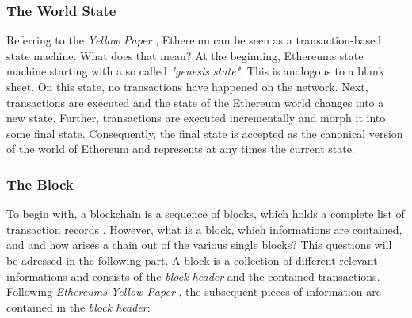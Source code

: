 \subsubsection{The World State}
Referring to the \textit{Yellow Paper} \cite{wood2014ethereum}, Ethereum can be seen as a transaction-based state machine. What does that mean? At the beginning, Ethereums state machine starting with a so called \textit{"genesis state"}. This is analogous to a blank sheet. On this state, no transactions have happened on the network. Next, transactions are executed and the state of the Ethereum world changes into a new state. Further, transactions are executed incrementally and morph it into some final state. Consequently, the final state is accepted as the canonical version of the world of Ethereum and represents at any times the current state.

\subsubsection{The Block} 
To begin with, a blockchain is a sequence of blocks, which holds a complete list of transaction records \cite{zheng2017overview}. However, what is a block, which informations are contained, and and how arises a chain out of the various single blocks? This questions will be adressed in the following part. 
A block is a collection of different relevant informations and consists of the \textit{block header} and the contained transactions. Following \textit{Ethereums Yellow Paper} \cite{wood2014ethereum}, the subsequent pieces of information are contained in the \textit{block header}:

